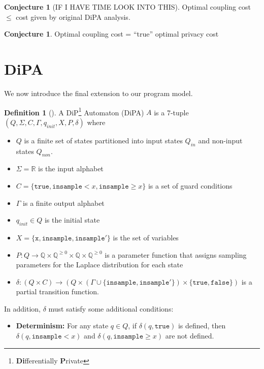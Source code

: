 \documentclass[12pt]{article}
\newcommand{\QQ}{\mathbb{Q}}
\newcommand{\RR}{\mathbb{R}}
\newcommand{\gguard}[1][x]{\texttt{insample}\geq #1}
\newcommand{\lguard}[1][x]{\texttt{insample} < #1}
\theoremstyle{definition}
\newtheorem{defn}[thm]{Definition}
\newtheorem{conj}[thm]{Conjecture}
\begin{document}
\begin{conj}[IF I HAVE TIME LOOK INTO THIS]
    Optimal coupling cost $\leq$ cost given by original DiPA analysis. 
\end{conj}

\begin{conj}
    Optimal coupling cost = ``true'' optimal privacy cost
\end{conj}


\section{DiPA}

We now introduce the final extension to our program model. 

\begin{defn}[\cite{chadhaLinearTimeDecidability2021}]
    A DiP\footnote{\textbf{Di}fferentially \textbf{P}rivate} Automaton (DiPA) $A$ is a 7-tuple $(Q, \Sigma, C, \Gamma, q_{init}, X, P, \delta)$ where
    \begin{itemize}
        \item $Q$ is a finite set of states partitioned into input states $Q_{in}$ and non-input states $Q_{non}$. 
        \item $\Sigma = \RR$ is the input alphabet
        \item $C = \{\texttt{true}, \lguard, \gguard\}$ is a set of guard conditions
        \item $\Gamma$ is a finite output alphabet
        \item $q_{init}\in Q$ is the initial state
        \item $X = \{\texttt{x}, \texttt{insample}, \texttt{insample}'\}$ is the set of variables
        \item $P: Q\to \QQ\times \QQ^{\geq 0}\times \QQ\times  \QQ^{\geq 0}$ is a parameter function that assigns sampling parameters for the Laplace distribution for each state
        \item $\delta:(Q\times C)\to (Q\times (\Gamma \cup \{\texttt{insample}, \texttt{insample}'\})\times \{\texttt{true}, \texttt{false}\})$ is a partial transition function. 
    \end{itemize}
    In addition, $\delta$ must satisfy some additional conditions:
    
    \begin{itemize}
        \item \textbf{Determinism:} For any state $q\in Q$, if $\delta(q,\texttt{true})$ is defined, then $\delta(q,\lguard)$ and $\delta(q,\gguard)$ are not defined. 


\end{itemize}
\end{defn}
\end{document}
